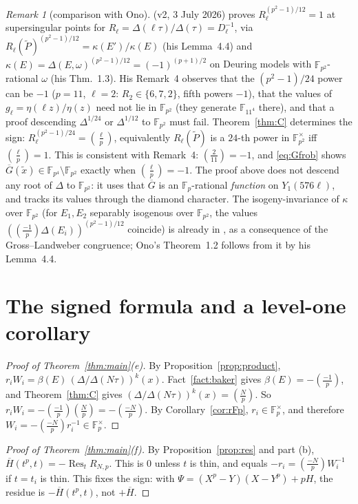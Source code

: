 \documentclass[11pt,a4paper]{article}
\numberwithin{equation}{section}
\theoremstyle{definition}
\theoremstyle{remark}
\newtheorem{remark}[theorem]{Remark}
\newcommand{\Fp}{\mathbb F_p}
\newcommand{\Fq}{\mathbb F_{p^2}}
\newcommand{\Res}{\operatorname{Res}}
\newcommand{\leg}[2]{\left(\frac{#1}{#2}\right)}
\newcommand{\Lp}[1]{\left(\frac{#1}{p}\right)}
\begin{document}
\begin{remark}[comparison with Ono]\label{rem:ono}
\citet[Thm.~1.2]{Ono25} (v2, 3 July 2026) proves $R_\ell^{(p^2-1)/12}=1$ at supersingular points
for $R_\ell=\Delta(\ell\tau)/\Delta(\tau)=D_\ell^{-1}$, via $R_\ell(\tilde P)^{(p^2-1)/12}=\kappa(E')/\kappa(E)$
(his Lemma~4.4) and $\kappa(E)=\Delta(E,\omega)^{(p^2-1)/12}=(-1)^{(p+1)/2}$ on Deuring models with
$\Fq$-rational $\omega$ (his Thm.~1.3). His Remark~4 observes that the $(p^2-1)/24$ power can be $-1$
($p=11$, $\ell=2$: $R_2\in\{6,7,2\}$, fifth powers $-1$), that the values of
$g_\ell=\eta(\ell z)/\eta(z)$ need not lie in $\Fq$ (they generate $\mathbb F_{11^4}$ there), and that
a proof descending $\Delta^{1/24}$ or $\Delta^{1/12}$ to $\Fq$ must fail. Theorem~\ref{thm:C}
determines the sign: $R_\ell^{(p^2-1)/24}=\leg{\ell}{p}$, equivalently $R_\ell(\tilde P)$ is a
$24$-th power in $\Fq^\times$ iff $\leg{\ell}{p}=1$. This is consistent with Remark~4: $\leg{2}{11}=-1$,
and \eqref{eq:Gfrob} shows $\overline G(\tilde x)\in\mathbb F_{p^4}\setminus\Fq$ exactly when
$\leg{\ell}{p}=-1$. The proof above does not descend any root of $\Delta$ to $\Fq$: it uses that
$\overline G$ is an $\Fp$-rational \emph{function} on $Y_1(576\ell)$, and tracks its values through
the diamond character. The isogeny-invariance of $\kappa$ over $\Fq$ (for $E_1,E_2$ separably isogenous over $\Fq$,
the values $(\Lp{-1}\Delta(E_i))^{(p^2-1)/12}$ coincide) is already in \citet[\S2]{Baker98}, as a
consequence of the Gross--Landweber congruence; Ono's Theorem~1.2 follows from it by his Lemma~4.4.
\end{remark}

\section{The signed formula and a level-one corollary}\label{sec:proof}

\begin{proof}[Proof of Theorem~\ref{thm:main}(e)]
By Proposition~\ref{prop:product}, $r_iW_i=\beta(E)\,(\Delta/\Delta(N\tau))^k(x)$. Fact~\ref{fact:baker}
gives $\beta(E)=-\Lp{-1}$, and Theorem~\ref{thm:C} gives $(\Delta/\Delta(N\tau))^k(x)=\Lp N$. So
$r_iW_i=-\Lp{-1}\Lp N=-\Lp{-N}$. By Corollary~\ref{cor:rFp}, $r_i\in\Fp^\times$, and therefore
$W_i=-\Lp{-N}r_i^{-1}\in\Fp^\times$.
\end{proof}

\begin{proof}[Proof of Theorem~\ref{thm:main}(f)]
By Proposition~\ref{prop:res} and part (b), $\overline H(t^p,t)=-\Res_tR_{N,p}$. This is $0$ unless $t$ is thin, and equals
$-r_i=\Lp{-N}W_i^{-1}$ if $t=t_i$ is thin. This fixes the sign: with
$\Psi=(X^p-Y)(X-Y^p)+pH$, the residue is $-\overline H(t^p,t)$, not $+\overline H$.
\end{proof}
\end{document}
